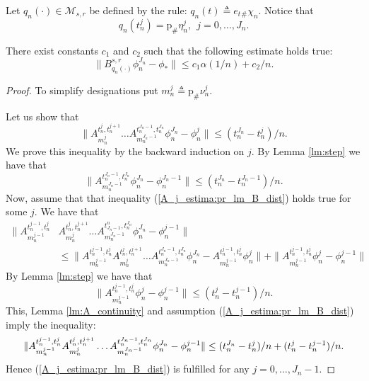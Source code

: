 \documentclass[a4paper,12pt]{article}
\begin{document}
Let $q_n(\cdot)\in\mathcal{M}_{s,r}$ be defined by the rule: $q_n(t)\triangleq e_t{}_\#\chi_n$.  Notice that \begin{equation}\label{equal:q_n_eta}
q_n(t_n^j)=\mathrm{p}_\#\eta_n^j,\ \ j=0,\ldots,J_n.
\end{equation}
\begin{lemma}\label{lm:B_distance} There exist constants $c_1$ and $c_2$ such that the following estimate holds true:
	$$\|B_{q_n(\cdot)}^{s,r}\phi_n^{J_n}-\phi_*\|\leq c_1\alpha(1/n)+c_2/n.$$
\end{lemma}
\begin{proof} To simplify designations put $m_n^j\triangleq \mathrm{p}_\#\nu_n^j$.
	
	Let us show that
	\begin{equation}\label{A_j_estima:pr_lm_B_dist}
	\|A^{t^j_n,t^{j+1}_n}_{m^j_n}\ldots A^{t^{J_n-1}_n,t^{J_n}_n}_{m^{J_n-1}_n}\phi^{J_n}_n-\phi^j_n\|\leq (t^{J_n}_n-t^{j}_n)/n.
	\end{equation} We prove this inequality by the backward induction on $j$.
	By Lemma \ref{lm:step} we have that $$\|A^{t^{J_n-1}_n,t^{J_n}_n}_{m^{J_n-1}_n}\phi^{J_n}_n-\phi_n^{J_n-1}\|\leq
	(t^{J_n}_n-t^{J_n-1}_n)/n. $$
	Now, assume that that inequality (\ref{A_j_estima:pr_lm_B_dist}) holds true for some $j$. We have that
	\begin{equation*}
	\begin{split}
	\|A^{t^{j-1}_n,t^{j}_n}_{m^{j-1}_n}&A^{t^j_n,t^{j+1}_n}_{m^j_n}\ldots A^{t_{J_n-1}^n,t^{J_n}_n}_{m^{J_n-1}_n}\phi^{J_n}_n-\phi^{j-1}_n\|\\&\leq
	\|A^{t^{j-1}_n,t^{j}_n}_{m^{j-1}_n}A^{t^j_n,t^{j+1}_n}_{m^j_n}\ldots  A^{t^{J_n-1}_n,t^{J_n}_n}_{m^{J_n-1}_n}\phi^{J_n}_n- A^{t^{j-1}_n,t^{j}_n}_{m^{j-1}_n}\phi^{j}_n\|+\|A^{t^{j-1}_n,t^{j}_n}_{m^{j-1}_n}\phi^{j}_n- \phi^{j-1}_n\|
	\end{split}
	\end{equation*}
	By Lemma \ref{lm:step} we have that 
	$$\|A_{m_n^{j-1}}^{t_n^{j-1},t_n^j}\phi_n^j-\phi_n^{j-1}\|\leq (t_n^j-t_n^{j-1})/n. $$
	This, Lemma \ref{lm:A_continuity} and assumption (\ref{A_j_estima:pr_lm_B_dist}) imply the inequality:
	$$
	\|A^{t^{j-1}_n,t^{j}_n}_{m^{j-1}_n}A^{t^j_n,t^{j+1}_n}_{m^j_n}\ldots A^{t^{J_n-1}_n,t^{J_n}_n}_{m^{J_n-1}_n}\phi^{J_n}_n-\phi^{j-1}_n\|\\\leq
	(t^{J_n}_n-t^{j}_n)/n+(t^{j}_n-t^{j-1}_n)/n. $$ Hence (\ref{A_j_estima:pr_lm_B_dist}) is fulfilled for any $j=0,\ldots, J_n-1$.
	

\end{proof}
\end{document}
